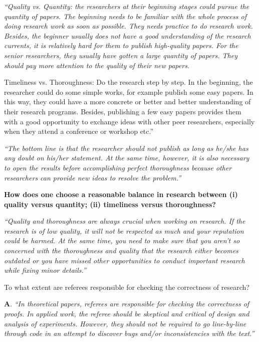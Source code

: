 \documentclass[portrait,11pt]{seminar}
\begin{document}
\es
\bs
{\it
``Quality vs. Quantity: the researchers at their beginning stages could pursue the
quantity of papers. The beginning needs to be familiar with the whole process of doing
research work as soon as possible. They needs practice to do research work. Besides,
the beginner usually does not have a good understanding of the research currents, it
is relatively hard for them to publish high-quality papers. For the senior researchers,
they usually have gotten a large quantity of papers. They should pay more attention
to the quality of their new papers.

Timeliness vs. Thoroughness: Do the research step by step. In the beginning, the
researcher could do some simple works, for example publish some easy papers. In
this way, they could have a more concrete or better and better understanding of their
research programs. Besides, publishing a few easy papers provides them with a good
opportunity to exchange ideas with other peer researchers, especially when they attend
a conference or workshop etc.''
}
\es
\bs
{\it ``The bottom line is that the researcher should not publish as long as he/she has any doubt on his/her statement. At the same time, however, it is also necessary to open the results before accomplishing perfect thoroughness because other researchers can provide new ideas to resolve the problem.''}


\es
\bs
{\bf How does one choose a reasonable balance in research between (i) quality versus quantity; (ii) timeliness versus thoroughness?}

{\it ``Quality and thoroughness are always crucial when working on research. If the research is of low quality, it will not be respected as much and your reputation could be harmed. At the same time, you need to make sure that you aren’t so concerned with the thoroughness and quality that the research either becomes outdated or you have missed other opportunities to conduct important research while fixing minor details.''}


\es \bs To what extent are referees responsible for checking the correctness of research? 


{\bf A}. {\it ``In theoretical papers, referees are responsible for checking the correctness of proofs. In applied work, the referee should be skeptical and critical of design and analysis of experiments. However, they should not be required to go line-by-line through code in an attempt to discover bugs and/or inconsistencies with the text.''}
\end{document}
